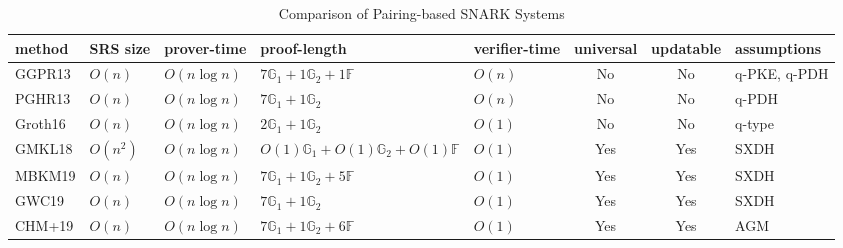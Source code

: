 \begin{table}[H]
\caption{Comparison of Pairing-based SNARK Systems}
\begin{tabular}{|l|l|l|p{3.2cm}|l|c|c|l|}
\hline
\toprule
method & SRS size & prover-time & proof-length & verifier-time & universal & updatable & assumptions \\ \hline\toprule
\midrule
GGPR13 & $O(n)$ & $O(n \log n)$ & $7 \mathbb{G}_1 + 1 \mathbb{G}_2 + 1 \mathbb{F}$ & $O(n)$ & No & No & q-PKE, q-PDH \\ \hline
PGHR13 & $O(n)$ & $O(n \log n)$ & $7 \mathbb{G}_1 + 1 \mathbb{G}_2$ & $O(n)$ & No & No & q-PDH \\ \hline
Groth16 & $O(n)$ & $O(n \log n)$ & $2 \mathbb{G}_1 + 1 \mathbb{G}_2$ & $O(1)$ & No & No & q-type \\ \hline
GMKL18 & $O(n^2)$ & $O(n \log n)$ & $O(1) \mathbb{G}_1 + O(1) \mathbb{G}_2 + O(1) \mathbb{F}$ & $O(1)$ & Yes & Yes & SXDH \\ \hline
MBKM19 & $O(n)$ & $O(n \log n)$ & $7 \mathbb{G}_1 + 1 \mathbb{G}_2 + 5 \mathbb{F}$ & $O(1)$ & Yes & Yes & SXDH \\ \hline
GWC19 & $O(n)$ & $O(n \log n)$ & $7 \mathbb{G}_1 + 1 \mathbb{G}_2$ & $O(1)$ & Yes & Yes & SXDH \\ \hline
CHM+19 & $O(n)$ & $O(n \log n)$ & $7 \mathbb{G}_1 + 1 \mathbb{G}_2 + 6 \mathbb{F}$ & $O(1)$ & Yes & Yes & AGM \\ \hline\bottomrule
\bottomrule
\end{tabular}
\end{table}
